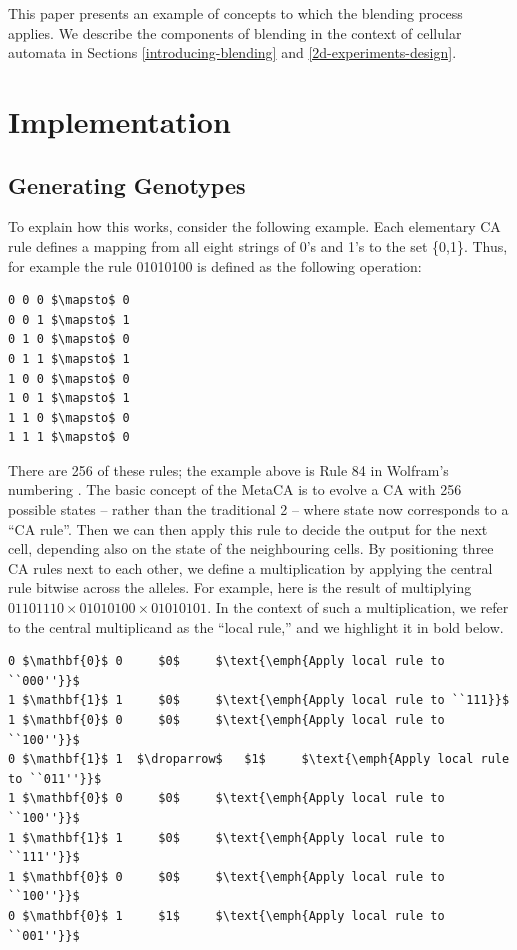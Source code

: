 \documentclass{AISB2008}
\newcommand{\droparrow}{%
  \mathchoice{\raisebox{-4pt}{$\displaystyle\mapsto$}}
             {\raisebox{-4pt}{$\mapsto$}}
             {\raisebox{-2pt}{$\scriptstyle\mapsto$}}
             {\raisebox{-2pt}{$\scriptscriptstyle\mapsto$}}}
\begin{document}
This paper presents an example of concepts to which the blending
process applies.  We describe the components of blending in the
context of cellular automata in Sections \ref{introducing-blending}
and \ref{2d-experiments-design}.

\clearpage

\section{Implementation}


\subsection{Generating Genotypes}

To explain how this works, consider the following example.  Each
elementary CA rule defines a mapping from all eight strings of 0's and
1's to the set \{0,1\}.  Thus, for example the rule 01010100 is defined as the following operation:
\begin{lstlisting}[mathescape]
0 0 0 $\mapsto$ 0
0 0 1 $\mapsto$ 1
0 1 0 $\mapsto$ 0
0 1 1 $\mapsto$ 1
1 0 0 $\mapsto$ 0
1 0 1 $\mapsto$ 1
1 1 0 $\mapsto$ 0
1 1 1 $\mapsto$ 0
\end{lstlisting}

There are 256 of these rules; the example above is Rule 84 in
Wolfram's numbering \cite{wolfram1994cellular}.  The basic concept of
the MetaCA is to evolve a CA with 256 possible states -- rather than
the traditional 2 -- where state now corresponds to a ``CA rule''.
Then we can then apply this rule to decide the output for the next
cell, depending also on the state of the neighbouring cells.  By
positioning three CA rules next to each other, we define a
multiplication by applying the central rule bitwise across the alleles.
%
For example, here is the result of multiplying $01101110\times
01010100\times 01010101$.  In the context of such a multiplication, we
refer to the central multiplicand as the ``local rule,'' and we
highlight it in bold below.

\lstset{
  xleftmargin=.1\columnwidth, xrightmargin=.01\columnwidth
}

\begin{lstlisting}[mathescape]
0 $\mathbf{0}$ 0     $0$     $\text{\emph{Apply local rule to ``000''}}$
1 $\mathbf{1}$ 1     $0$     $\text{\emph{Apply local rule to ``111}}$
1 $\mathbf{0}$ 0     $0$     $\text{\emph{Apply local rule to ``100''}}$
0 $\mathbf{1}$ 1  $\droparrow$   $1$     $\text{\emph{Apply local rule to ``011''}}$
1 $\mathbf{0}$ 0     $0$     $\text{\emph{Apply local rule to ``100''}}$
1 $\mathbf{1}$ 1     $0$     $\text{\emph{Apply local rule to ``111''}}$
1 $\mathbf{0}$ 0     $0$     $\text{\emph{Apply local rule to ``100''}}$
0 $\mathbf{0}$ 1     $1$     $\text{\emph{Apply local rule to ``001''}}$
\end{lstlisting}
\end{document}
